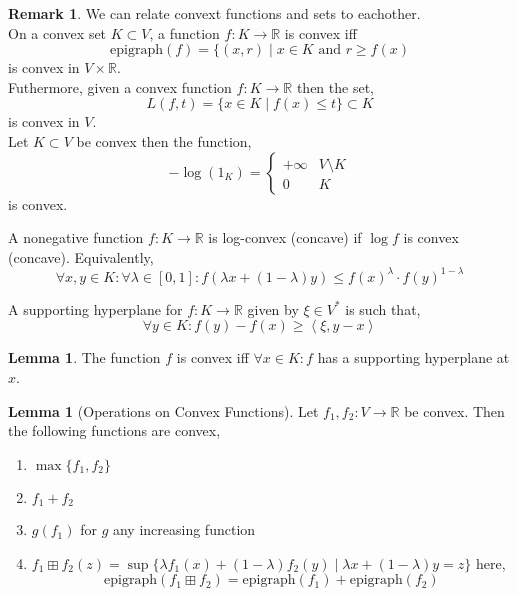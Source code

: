 \documentclass[12pt]{extarticle}
\newcommand{\R}{\mathbb{R}}
\theoremstyle{definition}
\newtheorem{lemma}[theorem]{Lemma}
\newtheorem{remark}{Remark}
\newenvironment{definition}[1][Definition:]{\begin{trivlist}
\item[\hskip \labelsep {\bfseries #1}]}{\end{trivlist}}
\newcommand{\inner}[2]{\left< #1, #2 \right>}
\newcommand{\epigraph}[1]{\mathrm{epigraph} \left( #1 \right)}
\begin{document}
\begin{remark}
We can relate convext functions and sets to eachother. 
\bigskip\\
On a convex set $K \subset V$, a function $f : K \to \R$ is convex iff
\[ \mathrm{epigraph} (f) = \{ (x, r) \mid x \in K \text{ and } r \ge f(x) \] 
is convex in $V \times \R$. 
\bigskip\\
Futhermore, given a convex function $f : K \to \R$ then the set,
\[ L(f, t) = \{ x \in K \mid f(x) \le t \} \subset K \]
is convex in $V$.
\bigskip\\
Let $K \subset V$ be convex then the function,
\[ - \log{(1_K)} = 
\begin{cases}
+\infty & V \setminus K
\\
0 & K
\end{cases} \]
is convex.
\end{remark}

\begin{definition}
A nonegative function $f : K \to \R$ is log-convex (concave) if $\log{f}$ is convex (concave). Equivalently,
\[ \forall x, y \in K : \forall \lambda \in [0,1] : f(\lambda x + (1 - \lambda)y) \le f(x)^\lambda \cdot f(y)^{1 - \lambda} \]
\end{definition}

\begin{definition}
A supporting hyperplane for $f : K \to \R$ given by $\xi \in V^*$ is such that,
\[ \forall y \in K : f(y) - f(x) \ge \inner{\xi}{y - x} \]
\end{definition}

\begin{lemma}
The function $f$ is convex iff $\forall x \in K : f$ has a supporting hyperplane at $x$. 
\end{lemma}

\begin{lemma}[Operations on Convex Functions]
Let $f_1, f_2 : V \to \R$ be convex. Then the following functions are convex,
\begin{enumerate}
\item $\max\{ f_1, f_2 \}$
\item $f_1 + f_2$
\item $g(f_1)$ for $g$ any increasing function
\item $f_1 \boxplus f_2 (z) = \sup \{ \lambda f_1(x) + (1 - \lambda) f_2(y) \mid \lambda x + (1- \lambda)y = z \}$ here,
 \[ \epigraph{f_1 \boxplus f_2} = \epigraph{f_1} + \epigraph{f_2} \]
\end{enumerate}
\end{lemma}
\end{document}
